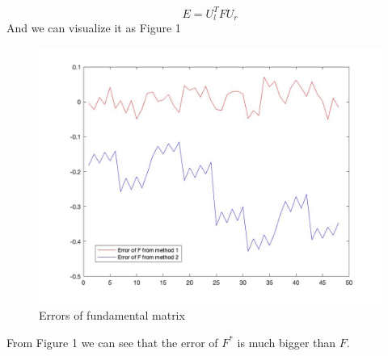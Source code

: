\documentclass{article}
\begin{document}
\begin{equation}
E = U_l^TFU_r
\end{equation}
And we can visualize it as Figure 1
\begin{figure}[H]
\centering
\includegraphics[scale=0.2]{Error.jpg}
\caption{Errors of fundamental matrix}
\label{fig:label}
\end{figure}
From Figure 1 we can see that the error of $F^*$ is much bigger than $F$.
\end{document}
